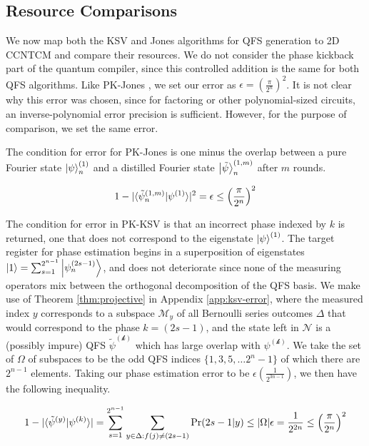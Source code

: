 \subsection{Resource Comparisons}
\label{subsec:ksv-compare}

We now map both the KSV and Jones algorithms for QFS generation
to \textsf{2D CCNTCM} and compare their resources. We do not consider
the phase kickback part of the quantum compiler, since this controlled addition
is the same for both QFS algorithms. Like PK-Jones \cite{Jones2012}, we
set our error as $\epsilon = \left(\frac{\pi}{2^n}\right)^2$. It is not clear why
this error was chosen, since for factoring or other polynomial-sized circuits,
an inverse-polynomial error precision is sufficient. However, for the
purpose of comparison, we set the same error.

The condition for error for PK-Jones is one minus the overlap between a
pure Fourier state $\left\vert{\psi}\right\rangle^{(1)}_n$ and a distilled
Fourier state $\left\vert{\tilde{\psi}}\right\rangle^{(1,m)}_n$ after $m$ rounds.

\begin{equation}
1 - | \langle \tilde{\psi}^{(1,m)}_n|\psi^{(1)} \rangle |^2 = \epsilon \le \left( \frac{\pi}{2^n} \right)^2 
\end{equation}

The condition for error in PK-KSV is that an incorrect phase indexed by $k$ is returned,
one that does not correspond to the eigenstate $\left\vert{\psi}\right\rangle^{(1)}$. The target
register for phase estimation begins in a superposition of eigenstates
$\left\vert{1}\right\rangle = \sum_{s = 1}^{2^{n-1}} \left\vert{\psi^{(2s-1)}_n}\right\rangle$, and does not deteriorate
since none of the measuring operators mix between the orthogonal decomposition of the
QFS basis. We make use of Theorem \ref{thm:projective} in Appendix \ref{app:ksv-error},
where the measured index $y$ corresponds to a subspace $\mathcal{M}_y$ of all Bernoulli series outcomes $\Delta$ that would
correspond to the phase $k = (2s-1)$, and the state left in $\mathcal{N}$ is a (possibly impure)
QFS $\mathcal{\tilde{\psi}^{(k)}}$ which has large overlap with $\mathcal{\psi^{(k)}}$.
We take the set of $\Omega$ of subspaces to be the odd QFS indices $\{1, 3, 5, \ldots 2^n - 1\}$
of which there are $2^{n-1}$ elements. Taking our phase estimation error to be $\epsilon \left( \frac{1}{2^{3n-1}} \right)$,
we then have the following inequality.

\begin{equation}
1 - | \langle \tilde{\psi}^{(y)}|\psi^{(k)} \rangle | = \sum_{s = 1}^{2^{n-1}} \sum_{y \in \Delta: f(j) \ne (2s-1)} \Pr(2s-1|y) \le |\Omega|\epsilon = \frac{1}{2^{2n}} \le \left( \frac{\pi}{2^n} \right)^2 
\end{equation}

